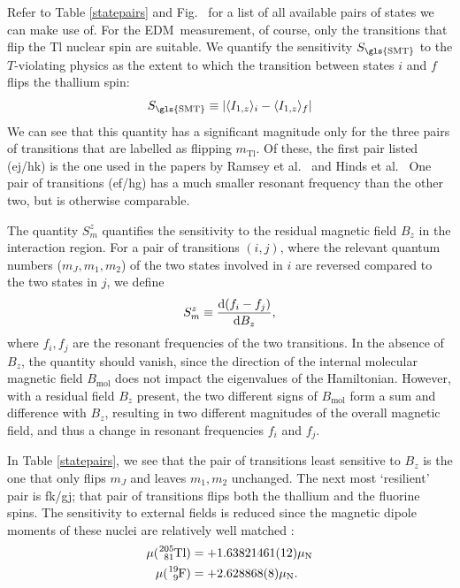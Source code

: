 Refer to Table \ref{statepairs} and Fig.~ for a list of all
available pairs of states we can make use of. For the \gls{EDM}\ measurement, of
course, only the transitions that flip the Tl nuclear spin are suitable. We
quantify the sensitivity $S_\text{\gls{SMT}}$ to the $T$-violating physics as
the extent to which the transition between states $i$ and $f$ flips the thallium
spin:
%
\begin{equation}
    \label{ssmt}
    S_\text{\gls{SMT}}\equiv
    |\ex{I_{1,z}}_i
    -
    \ex{I_{1,z}}_f|
\end{equation}
%
We can see that this quantity has a significant magnitude only for the three
pairs of transitions that are labelled as flipping $m_\text{Tl}$. Of these, the
first pair listed (ej/hk) is the one used in the papers by Ramsey et al.\
\cite{wilkening1984search} and Hinds et al.\ \cite{cho1991search} One pair of
transitions (ef/hg) has a much smaller resonant frequency than the other two,
but is otherwise comparable.

The quantity $S_m^z$ quantifies the sensitivity to the residual magnetic field
$B_z$ in the interaction region. For a pair of transitions $(i,j)$, where the
relevant quantum numbers ($m_J,m_1,m_2$) of the two states involved in $i$ are
reversed compared to the two states in $j$, we define
%
\[
    S_m^z\equiv
    \frac{\mathrm{d}(f_i-f_j)}{\mathrm{d} B_z},
\]
%
where $f_i,f_j$ are the resonant frequencies of the two transitions. In the
absence of $B_z$, the quantity should vanish, since the direction of the
internal molecular magnetic field $B_\text{mol}$ does not impact the eigenvalues
of the Hamiltonian. However, with a residual field $B_z$ present, the two
different signs of $B_\text{mol}$ form a sum and difference with $B_z$,
resulting in two different magnitudes of the overall magnetic field, and thus a
change in resonant frequencies $f_i$ and $f_j$.

In Table \ref{statepairs}, we see that the pair of transitions least sensitive
to $B_z$ is the one that only flips $m_J$ and leaves $m_1,m_2$ unchanged. The
next most `resilient' pair is fk/gj; that pair of transitions flips both the
thallium and the fluorine spins. The sensitivity to external fields is reduced
since the magnetic dipole moments of these nuclei are relatively well matched
\cite{stone2005table}:
%
\begin{align*}
    \mu(\ce{^{205}_{81}Tl})&=+1.63821461(12)\mu_\text{N}\\
    \mu(\ce{^{19}_{9}F})&=+2.628868(8)\mu_\text{N}.
\end{align*}

